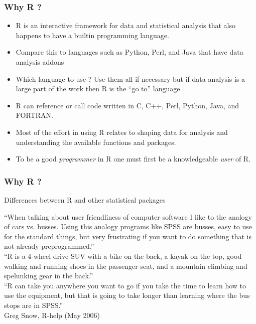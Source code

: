 \documentclass{beamer}
\begin{document}

\begin{frame}[fragile]
\frametitle{Why R ? }
\small
\begin{itemize}
\item R is an interactive framework for data and statistical analysis that also happens to have a builtin programming language. 
\item Compare this to languages such as Python, Perl, and Java that have data analysis addons
\item Which language to use ? Use them all if necessary but if data analysis is a large part of the work then R is the ``go to'' language
\item R can reference or call code written in C, C++, Perl, Python, Java, and FORTRAN.
\item Most of the effort in using R relates to shaping data for analysis and understanding the available functions and packages. 
\item To be a good \emph{programmer} in R one must first be a knowledgeable \emph{user} of R. 
\end{itemize}
\end{frame}


\begin{frame}[fragile]
\frametitle{Why R ? }
\small
\begin{block}{Differences between R and other statistical packages}

``When talking about user friendliness of computer software I like to the analogy of cars vs. busses. Using this analogy programs like SPSS are busses, easy to use for the standard things, but very frustrating if you want to do something that is not already preprogrammed.''
\newline
\\
``R is a 4-wheel drive SUV with a bike on the back, a kayak on the top, good walking and running shoes in the passenger seat, and a mountain climbing and spelunking gear in the back.''
\newline
\\
``R can take you anywhere you want to go if you take the time to learn how to use the equipment, but that is going to take longer than learning where the bus stops are in SPSS.''
\newline
\\
Greg Snow, R-help (May 2006)
\end{block}
\end{frame}
\end{document}
